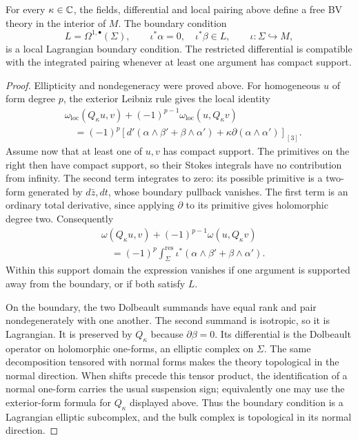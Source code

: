 \begin{proposition}
\label{prop:bf-bv-family}
For every $\kappa\in\mathbb C$, the fields, differential and local pairing above
define a free BV theory in the interior of $M$.  The boundary condition
\[
 L=\Omega^{1,\bullet}(\Sigma),\qquad
 \iota^*\alpha=0,\quad \iota^*\beta\in L,
 \qquad \iota:\Sigma\hookrightarrow M,
\]
is a local Lagrangian boundary condition.  The restricted differential
is compatible with the integrated pairing whenever at least one
argument has compact support.
\end{proposition}
\begin{proof}
Ellipticity and nondegeneracy were proved above.  For homogeneous $u$
of form degree $p$, the exterior Leibniz rule gives the local identity
\[
 \begin{split}
 &\omega_{\mathrm{loc}}(Q_\kappa u,v)
              +(-1)^{p-1}\omega_{\mathrm{loc}}(u,Q_\kappa v)\\
 &\quad=(-1)^p\left[d'(\alpha\wedge\beta'+\beta\wedge\alpha')
                  +\kappa\partial(\alpha\wedge\alpha')\right]_{[3]}.
 \end{split}
\]
Assume now that at least one of $u,v$ has compact support.  The
primitives on the right then have compact support, so their Stokes
integrals have no contribution from infinity.  The second term
integrates to zero: its possible primitive is a two-form generated
by $d\bar z,dt$, whose boundary pullback vanishes.  The first term is
an ordinary total derivative, since applying $\partial$ to its
primitive gives holomorphic degree two.  Consequently
\[
 \begin{split}
 &\omega(Q_\kappa u,v)+(-1)^{p-1}\omega(u,Q_\kappa v)\\
 &\quad=(-1)^p\int_\Sigma^{\mathrm{res}}
    \iota^*(\alpha\wedge\beta'+\beta\wedge\alpha').
 \end{split}
\]
Within this support domain the expression vanishes if one argument
is supported away from the boundary, or if both satisfy $L$.

On the boundary, the two Dolbeault summands have equal rank and pair
nondegenerately with one another.  The second summand is isotropic,
so it is Lagrangian.  It is preserved by $Q_\kappa$ because
$\partial\beta=0$.  Its differential is the Dolbeault operator on
holomorphic one-forms, an elliptic complex on $\Sigma$.
The same decomposition tensored with normal forms makes the theory
topological in the normal direction.  When shifts precede this tensor
product, the identification of a normal one-form carries the usual
suspension sign; equivalently one may use the exterior-form formula
for $Q_\kappa$ displayed above.  Thus the boundary condition is a Lagrangian elliptic subcomplex,
and the bulk complex is topological in its normal direction.
\end{proof}

